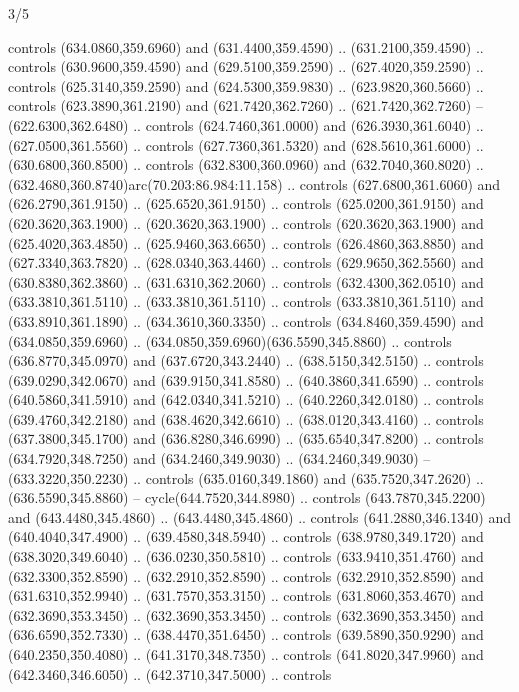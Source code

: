 \begin{flagdescription}{3/5}
\begin{scope}[xshift=0.5\flaglength,yshift=0.5\flagwidth,scale=\flagwidth/602.3]
\begin{scope}[y=0.8pt, x=0.8pt, yscale=-1, shift={(-600,-330)}]
  controls (634.0860,359.6960) and (631.4400,359.4590) .. (631.2100,359.4590) ..
  controls (630.9600,359.4590) and (629.5100,359.2590) .. (627.4020,359.2590) ..
  controls (625.3140,359.2590) and (624.5300,359.9830) .. (623.9820,360.5660) ..
  controls (623.3890,361.2190) and (621.7420,362.7260) .. (621.7420,362.7260) --
  (622.6300,362.6480) .. controls (624.7460,361.0000) and (626.3930,361.6040) ..
  (627.0500,361.5560) .. controls (627.7360,361.5320) and (628.5610,361.6000) ..
  (630.6800,360.8500) .. controls (632.8300,360.0960) and (632.7040,360.8020) ..
  (632.4680,360.8740)arc(70.203:86.984:11.158) .. controls (627.6800,361.6060)
  and (626.2790,361.9150) .. (625.6520,361.9150) .. controls (625.0200,361.9150)
  and (620.3620,363.1900) .. (620.3620,363.1900) .. controls (620.3620,363.1900)
  and (625.4020,363.4850) .. (625.9460,363.6650) .. controls (626.4860,363.8850)
  and (627.3340,363.7820) .. (628.0340,363.4460) .. controls (629.9650,362.5560)
  and (630.8380,362.3860) .. (631.6310,362.2060) .. controls (632.4300,362.0510)
  and (633.3810,361.5110) .. (633.3810,361.5110) .. controls (633.3810,361.5110)
  and (633.8910,361.1890) .. (634.3610,360.3350) .. controls (634.8460,359.4590)
  and (634.0850,359.6960) .. (634.0850,359.6960)(636.5590,345.8860) .. controls
  (636.8770,345.0970) and (637.6720,343.2440) .. (638.5150,342.5150) .. controls
  (639.0290,342.0670) and (639.9150,341.8580) .. (640.3860,341.6590) .. controls
  (640.5860,341.5910) and (642.0340,341.5210) .. (640.2260,342.0180) .. controls
  (639.4760,342.2180) and (638.4620,342.6610) .. (638.0120,343.4160) .. controls
  (637.3800,345.1700) and (636.8280,346.6990) .. (635.6540,347.8200) .. controls
  (634.7920,348.7250) and (634.2460,349.9030) .. (634.2460,349.9030) --
  (633.3220,350.2230) .. controls (635.0160,349.1860) and (635.7520,347.2620) ..
  (636.5590,345.8860) -- cycle(644.7520,344.8980) .. controls
  (643.7870,345.2200) and (643.4480,345.4860) .. (643.4480,345.4860) .. controls
  (641.2880,346.1340) and (640.4040,347.4900) .. (639.4580,348.5940) .. controls
  (638.9780,349.1720) and (638.3020,349.6040) .. (636.0230,350.5810) .. controls
  (633.9410,351.4760) and (632.3300,352.8590) .. (632.2910,352.8590) .. controls
  (632.2910,352.8590) and (631.6310,352.9940) .. (631.7570,353.3150) .. controls
  (631.8060,353.4670) and (632.3690,353.3450) .. (632.3690,353.3450) .. controls
  (632.3690,353.3450) and (636.6590,352.7330) .. (638.4470,351.6450) .. controls
  (639.5890,350.9290) and (640.2350,350.4080) .. (641.3170,348.7350) .. controls
  (641.8020,347.9960) and (642.3460,346.6050) .. (642.3710,347.5000) .. controls

\end{scope}
\end{scope}
\end{flagdescription}

